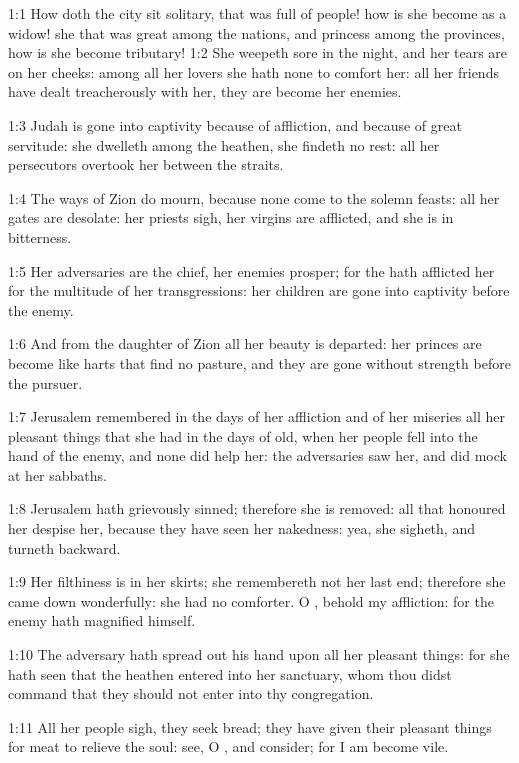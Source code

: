 

1:1 How doth the city sit solitary, that was full of people! how is she become as a widow! she that was great among the nations, and princess among the provinces, how is she become tributary!  1:2 She weepeth sore in the night, and her tears are on her cheeks: among all her lovers she hath none to comfort her: all her friends have dealt treacherously with her, they are become her enemies.

1:3 Judah is gone into captivity because of affliction, and because of great servitude: she dwelleth among the heathen, she findeth no rest: all her persecutors overtook her between the straits.

1:4 The ways of Zion do mourn, because none come to the solemn feasts: all her gates are desolate: her priests sigh, her virgins are afflicted, and she is in bitterness.

1:5 Her adversaries are the chief, her enemies prosper; for the \LORD hath afflicted her for the multitude of her transgressions: her children are gone into captivity before the enemy.

1:6 And from the daughter of Zion all her beauty is departed: her princes are become like harts that find no pasture, and they are gone without strength before the pursuer.

1:7 Jerusalem remembered in the days of her affliction and of her miseries all her pleasant things that she had in the days of old, when her people fell into the hand of the enemy, and none did help her: the adversaries saw her, and did mock at her sabbaths.

1:8 Jerusalem hath grievously sinned; therefore she is removed: all that honoured her despise her, because they have seen her nakedness: yea, she sigheth, and turneth backward.

1:9 Her filthiness is in her skirts; she remembereth not her last end; therefore she came down wonderfully: she had no comforter. O \LORD, behold my affliction: for the enemy hath magnified himself.

1:10 The adversary hath spread out his hand upon all her pleasant things: for she hath seen that the heathen entered into her sanctuary, whom thou didst command that they should not enter into thy congregation.

1:11 All her people sigh, they seek bread; they have given their pleasant things for meat to relieve the soul: see, O \LORD, and consider; for I am become vile.

